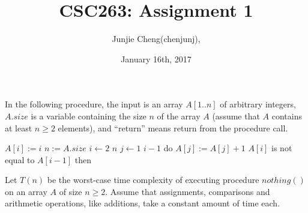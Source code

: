\documentclass[11pt, answers]{exam}
\theoremstyle{plain}
\theoremstyle{definition}
\begin{document}
 


\title{CSC263: Assignment 1}
\date{January 16th, 2017}
\author{Junjie Cheng(chenjunj),}
\maketitle

\unframedsolutions

\begin{questions}

\question

In the following procedure, the input is an array $A[1..n]$ of arbitrary integers, $A.size$ is a variable containing the size $n$ of the array $A$ (assume that $A$ contains at least $n \ge 2$ elements), and “return” means return from the procedure call.

\begin{codebox}
\li $A[i] := i$
\li $n := A.size$
\li \For $i \gets 2$ \To $n$ \Do
\li 	\For $j \gets 1$ \To $i-1$ do $A[j] := A[j]+1$
\li		\If $A[i]$ is not equal to $A[i-1]$ then \Return \End 
		\End 
	\End
\li \Return
\end{codebox}

Let $T(n)$ be the worst-case time complexity of executing procedure $nothing()$ on an array $A$ of size $n \ge 2$. Assume that assignments, comparisons and arithmetic operations, like additions, take a constant amount of time each.




\end{questions}
\end{document}
